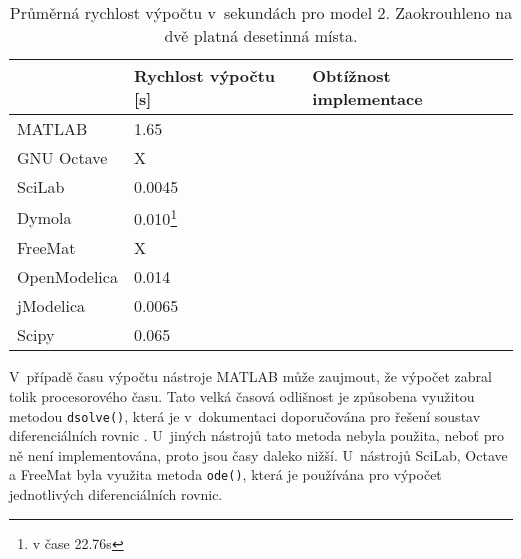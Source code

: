 \begin{savenotes}
\begin{table}[ht]
\centering
\begin{tabular}{|l|l|l|}
\hline
             & Rychlost výpočtu {[}s{]} & Obtížnost implementace \\ \hline
MATLAB       &         1.65                 &  \\ \hline
GNU Octave   &           X               &  \\ \hline
SciLab       &            0.0045              &  \\ \hline
Dymola       &           0.010\footnote{v čase 22.76s}               &  \\ \hline
FreeMat &                  X        &  \\ \hline
OpenModelica    &        0.014                  &  \\ \hline
jModelica        &       0.0065              &  \\ \hline
Scipy             &      0.065                    &  \\ \hline
\end{tabular}
\caption{Průměrná rychlost výpočtu v~sekundách pro model 2. Zaokrouhleno na dvě platná desetinná místa.}
\label{tab:kruh-tabulka}
\end{table}
\end{savenotes}

V~případě času výpočtu nástroje MATLAB může zaujmout, že výpočet zabral tolik procesorového času. Tato velká časová odlišnost je způsobena využitou metodou \texttt{dsolve()}, která je v~dokumentaci doporučována pro řešení soustav diferenciálních rovnic \cite{MATLAB:2010}. U~jiných nástrojů tato metoda nebyla použita, neboť pro ně není implementována, proto jsou časy daleko nižší. U~nástrojů SciLab, Octave a FreeMat byla využita metoda \texttt{ode()}, která je používána pro výpočet jednotlivých diferenciálních rovnic.

